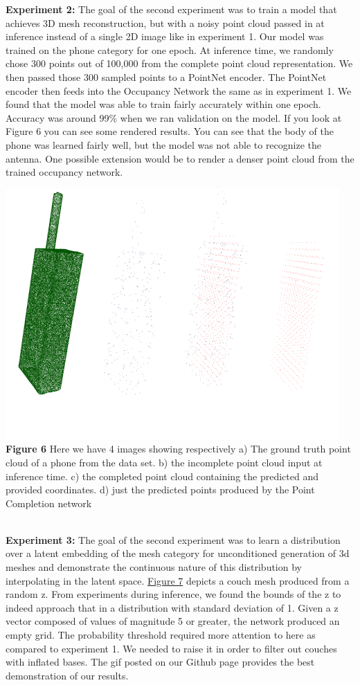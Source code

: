 \documentclass[11pt]{article}
\begin{document}
\textbf{Experiment 2:}
The goal of the second experiment was to train a model that achieves 3D mesh reconstruction, but with a noisy point cloud passed in at inference instead of a single 2D image like in experiment 1. Our model was trained on the phone category for one epoch. At inference time, we randomly chose 300 points out of 100,000 from the complete point cloud representation. We then passed those 300 sampled points to a PointNet encoder. The PointNet encoder then feeds into the Occupancy Network the same as in experiment 1. We found that the model was able to train fairly accurately within one epoch. Accuracy was around 99\% when we ran validation on the model. If you look at Figure 6 you can see some rendered results. You can see that the body of the phone was learned fairly well, but the model was not able to recognize the antenna. One possible extension would be to render a denser point cloud from the trained occupancy network.

\includegraphics[scale=1.4]{phoneImages/compilation.png} \\
\caption{\hypertarget{fig6}{\textbf{Figure 6}} Here we have 4 images showing respectively a) The ground truth point cloud of a phone from the data set. b) the incomplete point cloud input at inference time. c) the completed point cloud containing the predicted and provided coordinates. d) just the predicted points produced by the Point Completion network}\\

\textbf{Experiment 3:} The goal of the second experiment was to learn a distribution over a latent embedding of the mesh category for unconditioned generation of 3d meshes and demonstrate the continuous nature of this distribution by interpolating in the latent space. \hyperlink{fig7}{Figure 7} depicts a couch mesh produced from a random z. From experiments during inference, we found the bounds of the z to indeed approach that in a distribution with standard deviation of 1. Given a z vector composed of values of magnitude 5 or greater, the network produced an empty grid. The probability threshold required more attention to here as compared to experiment 1. We needed to raise it in order to filter out couches with inflated bases. The gif posted on our Github page provides the best demonstration of our results.
\end{document}
